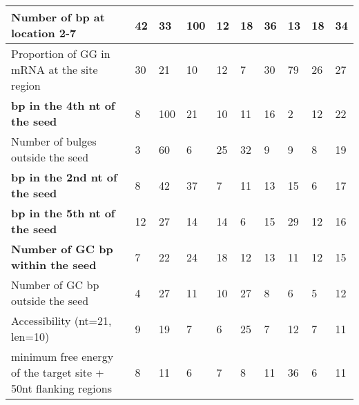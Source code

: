 \documentclass{bmcart}
\begin{document}
\begin{backmatter}
\begin{table}[h!]
\begin{threeparttable}
\begin{tabular}{|l|l|l|l|l|l|l|l|l|l|}
\textbf{Number of bp at location 2-7\tnote{n}} & 42\tnote{*}           & 33           & 100\tnote{*}          & 12          & 18          & 36\tnote{*}          & 13          & 18          & 34            \\ \hline
Proportion of GG in mRNA at the site region\tnote{n}                            & 30\tnote{*}           & 21           & 10           & 12          & 7           & 30\tnote{*}          & 79\tnote{*}          & 26\tnote{*}          & 27            \\ \hline
\textbf{bp in the 4th nt of the seed\tnote{b}}                    & 8            & 100\tnote{*}          & 21           & 10          & 11          & 16          & 2           & 12          & 22            \\ \hline
Number of bulges outside the seed\tnote{n}                 & 3            & 60\tnote{*}           & 6            & 25\tnote{*}          & 32\tnote{*}          & 9           & 9           & 8           & 19            \\ \hline
\textbf{bp in the 2nd nt of the seed\tnote{b}}                    & 8            & 42           & 37\tnote{*}           & 7           & 11          & 13          & 15          & 6           & 17            \\ \hline
\textbf{bp in the 5th nt of the seed\tnote{b}}                    & 12           & 27           & 14           & 14          & 6           & 15          & 29\tnote{*}          & 12          & 16            \\ \hline
\textbf{Number of GC bp within the seed\tnote{n}}              & 7            & 22           & 24\tnote{*}           & 18\tnote{*}          & 12          & 13          & 11          & 12          & 15            \\ \hline
Number of GC bp outside the seed\tnote{n}                         & 4            & 27           & 11           & 10          & 27\tnote{*}          & 8           & 6           & 5           & 12            \\ \hline
Accessibility (nt=21, len=10)\tnote{n}                                    & 9            & 19           & 7            & 6           & 25          & 7           & 12          & 7           & 11            \\ \hline
minimum free energy of the target site + 50nt flanking regions\tnote{n}            & 8            & 11           & 6            & 7           & 8           & 11          & 36\tnote{*}          & 6           & 11            \\ \hline

\end{tabular}
\end{threeparttable}
\end{table}
\end{backmatter}
\end{document}
